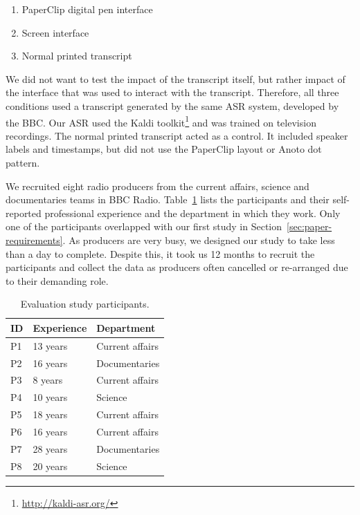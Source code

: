 \begin{enumerate}[label=C\arabic*.]
  \item PaperClip digital pen interface
  \item Screen interface
  \item Normal printed transcript
\end{enumerate}

We did not want to test the impact of the transcript itself, but rather impact of the interface that was used to
interact with the transcript. Therefore, all three conditions used a transcript generated by the same ASR system,
developed by the BBC. Our ASR used the Kaldi toolkit\footnote{\url{http://kaldi-asr.org/}} and was trained on
television recordings.
The normal printed transcript acted as a control. It included speaker labels and timestamps, but did not use the
PaperClip layout or Anoto dot pattern.

We recruited eight radio producers from the current affairs, science and documentaries teams in BBC Radio.
Table~\ref{tab:participants} lists the participants and their self-reported professional experience and the department in
which they work.
Only one of the
participants overlapped with our first study in Section~\ref{sec:paper-requirements}.  As producers are very busy, we
designed our study to take less than a day to complete. Despite this, it took us 12 months to recruit the participants
and collect the data as producers often cancelled or re-arranged due to their demanding role.

\begin{table}[h]
  \centering
  \begin{tabular}{l l l}
      \hline
      \textbf{ID} & \textbf{Experience} & \textbf{Department} \\ %
      \hline
      P1 & 13 years & Current affairs \\%
      P2 & 16 years & Documentaries   \\%
      P3 & 8 years  & Current affairs \\%
      P4 & 10 years & Science         \\%
      P5 & 18 years & Current affairs \\%
      P6 & 16 years & Current affairs \\%
      P7 & 28 years & Documentaries   \\%
      P8 & 20 years & Science         \\%
      \hline
  \end{tabular}
  \caption{Evaluation study participants.}
  \label{tab:participants}
\end{table}

